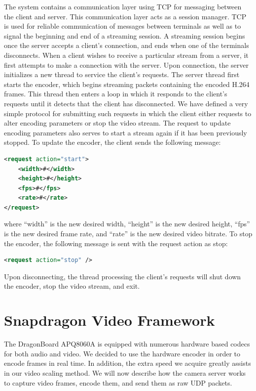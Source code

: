 \documentclass[3p,times,procedia]{elsarticle}
\begin{document}
The system contains a communication layer using TCP for messaging between the client and server. This communication layer acts as a session manager. TCP is used for reliable communication of messages between terminals as well as to signal the beginning and end of a streaming session. A streaming session begins once the server accepts a client's connection, and ends when one of the terminals disconnects. When a client wishes to receive a particular stream from a server, it first attempts to make a connection with the server. Upon connection, the server initializes a new thread to service the client's requests. The server thread first starts the encoder, which begins streaming packets containing the encoded H.264 frames. This thread then enters a loop in which it responds to the client's requests until it detects that the client has disconnected. We have defined a very simple protocol for submitting such requests in which the client either requests to alter encoding parameters or stop the video stream. The request to update encoding parameters also serves to start a stream again if it has been previously stopped. To update the encoder, the client sends the following message:
%
\begin{lstlisting}[language=xml, frame=single]
<request action="start">
	<width>#</width>
	<height>#</height>
	<fps>#</fps>
	<rate>#</rate>
</request>
\end{lstlisting}
where ``width'' is the new desired width, ``height'' is the new desired height, ``fps'' is the new desired frame rate, and ``rate'' is the new desired video bitrate. To stop the encoder, the following message is sent with the request action as stop:
%
\begin{lstlisting}[language=xml, frame=single]
<request action="stop" />
\end{lstlisting}
Upon disconnecting, the thread processing the client's requests will shut down the encoder, stop the video stream, and exit.


\section{Snapdragon Video Framework}
\label{sec:Snapdragon}

The DragonBoard APQ8060A is equipped with numerous hardware based codecs for both audio and video. We decided to use the hardware encoder in order to encode frames in real time. In addition, the extra speed we acquire greatly assists in our video scaling method. We will now describe how the camera server works to capture video frames, encode them, and send them as raw UDP packets.
\end{document}

